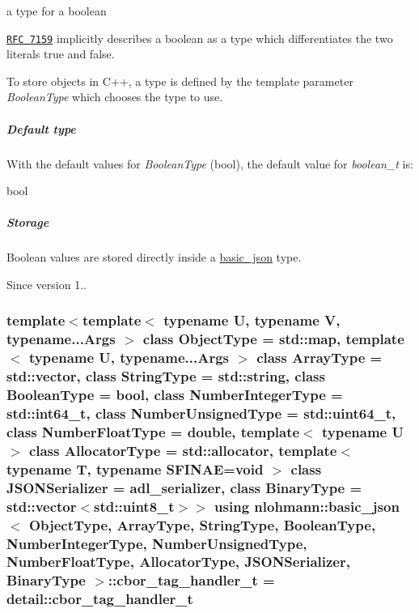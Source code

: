 a type for a boolean 

\href{http://rfc7159.net/rfc7159}{\tt R\+FC 7159} implicitly describes a boolean as a type which differentiates the two literals {\ttfamily true} and {\ttfamily false}.

To store objects in C++, a type is defined by the template parameter {\itshape Boolean\+Type} which chooses the type to use.

\subparagraph*{Default type}

With the default values for {\itshape Boolean\+Type} ({\ttfamily bool}), the default value for {\itshape boolean\+\_\+t} is\+:


\begin{DoxyCode}
\textcolor{keywordtype}{bool}
\end{DoxyCode}


\subparagraph*{Storage}

Boolean values are stored directly inside a \hyperlink{classnlohmann_1_1basic__json}{basic\+\_\+json} type.

\begin{DoxySince}{Since}
version 1.. 
\end{DoxySince}
\subsubsection[{\texorpdfstring{cbor\+\_\+tag\+\_\+handler\+\_\+t}{cbor_tag_handler_t}}]{\setlength{\rightskip}{0pt plus 5cm}template$<$template$<$ typename U, typename V, typename...\+Args $>$ class Object\+Type = std\+::map, template$<$ typename U, typename...\+Args $>$ class Array\+Type = std\+::vector, class String\+Type  = std\+::string, class Boolean\+Type  = bool, class Number\+Integer\+Type  = std\+::int64\+\_\+t, class Number\+Unsigned\+Type  = std\+::uint64\+\_\+t, class Number\+Float\+Type  = double, template$<$ typename U $>$ class Allocator\+Type = std\+::allocator, template$<$ typename T, typename S\+F\+I\+N\+A\+E=void $>$ class J\+S\+O\+N\+Serializer = adl\+\_\+serializer, class Binary\+Type  = std\+::vector$<$std\+::uint8\+\_\+t$>$$>$ using {\bf nlohmann\+::basic\+\_\+json}$<$ Object\+Type, Array\+Type, String\+Type, Boolean\+Type, Number\+Integer\+Type, Number\+Unsigned\+Type, Number\+Float\+Type, Allocator\+Type, J\+S\+O\+N\+Serializer, Binary\+Type $>$\+::{\bf cbor\+\_\+tag\+\_\+handler\+\_\+t} =  {\bf detail\+::cbor\+\_\+tag\+\_\+handler\+\_\+t}}\hypertarget{classnlohmann_1_1basic__json_a54951d14f0dd10cc3cfdaa24f8bfd15c}{}\label{classnlohmann_1_1basic__json_a54951d14f0dd10cc3cfdaa24f8bfd15c}


